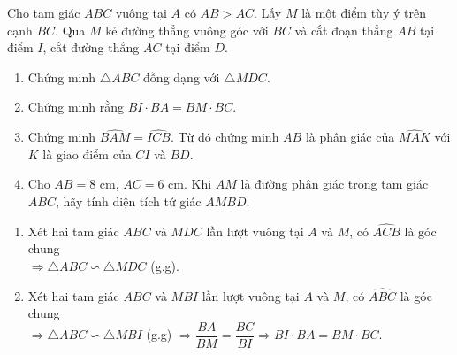 \begin{ex}%
    Cho tam giác $ABC$ vuông tại $A$ có $AB > AC$. Lấy $M$ là một điểm tùy ý trên cạnh $BC$. Qua $M$ kẻ đường thẳng vuông góc với $BC$ và cắt đoạn thẳng $AB$ tại điểm $I$, cắt đường thẳng $AC$ tại điểm $D$.
    \begin{enumerate}
    	\item Chứng minh $\triangle ABC$ đồng dạng với $\triangle MDC$.
    	\item Chứng minh rằng $BI \cdot BA = BM \cdot BC$.
    	\item Chứng minh $\widehat{BAM} = \widehat{ICB}$. Từ đó chứng minh $AB$ là phân giác của $\widehat{MAK}$ với $K$ là giao điểm của $CI$ và $BD$.
    	\item Cho $AB = 8$ cm, $AC = 6$ cm. Khi $AM$ là đường phân giác trong tam giác $ABC$, hãy tính diện tích tứ giác $AMBD$.
    \end{enumerate}
\loigiai
    {
    \begin{center}
    \end{center}
    \begin{enumerate}
        \item Xét hai tam giác $ABC$ và $MDC$ lần lượt vuông tại $A$ và $M$, có $\widehat{ACB}$ là góc chung\\
        $\Rightarrow \triangle ABC \backsim \triangle MDC$ (g.g).
        \item Xét hai tam giác $ABC$ và $MBI$ lần lượt vuông tại $A$ và $M$, có $\widehat{ABC}$ là góc chung\\
        $\Rightarrow \triangle ABC \backsim \triangle MBI$ (g.g) $\Rightarrow \dfrac{BA}{BM} = \dfrac{BC}{BI} \Rightarrow BI \cdot BA = BM \cdot BC$.

\end{enumerate}}
\end{ex}
